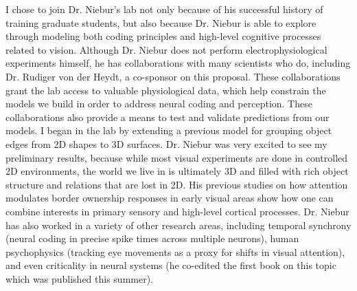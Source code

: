 \documentclass[11pt,notitlepage]{article}
\begin{document}
I chose to join Dr. Niebur's lab not only because of his successful history of training graduate students, but also because Dr. Niebur is able to explore through modeling both coding principles and high-level cognitive processes related to vision. Although Dr. Niebur does not perform electrophysiological experiments himself, he has collaborations with many scientists who do, including Dr. Rudiger von der Heydt, a co-sponsor on this proposal. These collaborations grant the lab access to valuable physiological data, which help constrain the models we build in order to address neural coding and perception. These collaborations also provide a means to test and validate predictions from our models. I began in the lab by extending a previous model for grouping object edges from 2D shapes to 3D surfaces. Dr. Niebur was very excited to see my preliminary results, because while most visual experiments are done in controlled 2D environments, the world we live in is ultimately 3D and filled with rich object structure and relations that are lost in 2D. His previous studies on how attention modulates border ownership responses in early visual areas show how one can combine interests in primary sensory and high-level cortical processes. Dr. Niebur has also worked in a variety of other research areas, including temporal synchrony (neural coding in precise spike times across multiple neurons), human psychophysics (tracking eye movements as a proxy for shifts in visual attention), and even criticality in neural systems (he co-edited the first book on this topic which was published this summer).

\clearpage
\end{document}
